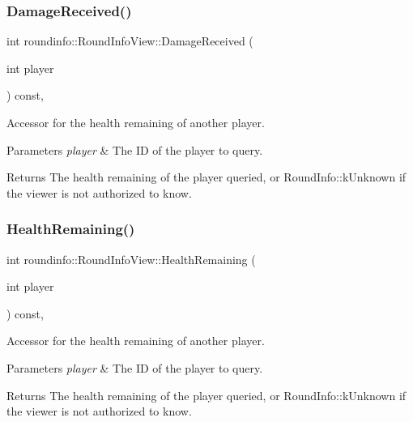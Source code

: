 \subsubsection{\texorpdfstring{Damage\+Received()}{DamageReceived()}}
{\footnotesize\ttfamily int roundinfo\+::\+Round\+Info\+View\+::\+Damage\+Received (\begin{DoxyParamCaption}\item[{int}]{player }\end{DoxyParamCaption}) const\hspace{0.3cm}{\ttfamily [inline]}, {\ttfamily [noexcept]}}



Accessor for the health remaining of another player. 


\begin{DoxyParams}{Parameters}
{\em player} & The ID of the player to query. \\
\hline
\end{DoxyParams}
\begin{DoxyReturn}{Returns}
The health remaining of the player queried, or {\ttfamily Round\+Info\+::k\+Unknown} if the viewer is not authorized to know. 
\end{DoxyReturn}
\mbox{\label{classroundinfo_1_1_round_info_view_a5b7dd1135b438e04017ad0a3bcc4034a}} 
\subsubsection{\texorpdfstring{Health\+Remaining()}{HealthRemaining()}}
{\footnotesize\ttfamily int roundinfo\+::\+Round\+Info\+View\+::\+Health\+Remaining (\begin{DoxyParamCaption}\item[{int}]{player }\end{DoxyParamCaption}) const\hspace{0.3cm}{\ttfamily [inline]}, {\ttfamily [noexcept]}}



Accessor for the health remaining of another player. 


\begin{DoxyParams}{Parameters}
{\em player} & The ID of the player to query. \\
\hline
\end{DoxyParams}
\begin{DoxyReturn}{Returns}
The health remaining of the player queried, or {\ttfamily Round\+Info\+::k\+Unknown} if the viewer is not authorized to know. 
\end{DoxyReturn}
\mbox{\label{classroundinfo_1_1_round_info_view_af00b23d7a3f2fa21fd3cbba1f71e0fd4}} 
